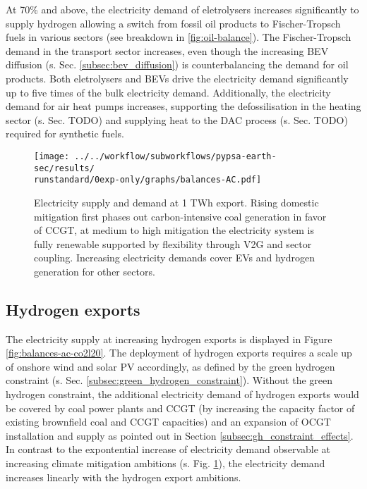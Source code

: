 At 70\% and above, the electricity demand of eletrolysers increases significantly to supply hydrogen allowing a switch from fossil oil products to Fischer-Tropsch fuels in various sectors (see breakdown in \ref{fig:oil-balance}). 
The Fischer-Tropsch demand in the transport sector increases, even though the increasing BEV diffusion (s. Sec. \ref{subsec:bev_diffusion}) is counterbalancing the demand for oil products. 
Both eletrolysers and BEVs drive the electricity demand significantly up to five times of the bulk electricity demand. 
Additionally, the electricity demand for air heat pumps increases, supporting the defossilisation in the heating sector (s. Sec. TODO) and supplying heat to the DAC process (s. Sec. TODO) required for synthetic fuels.


\begin{figure}[h!]
    \centering
    \texttt{[image: ../../workflow/subworkflows/pypsa-earth-sec/results/\\runstandard/0exp-only/graphs/balances-AC.pdf]}
    \caption{Electricity supply and demand at 1 TWh export. Rising domestic mitigation first phases out carbon-intensive coal generation in favor of CCGT, at medium to high mitigation the electricity system is fully renewable supported by flexibility through V2G and sector coupling. Increasing electricity demands cover EVs and hydrogen generation for other sectors.}
    \label{fig:balances-ac-0exp}
\end{figure}

\subsection{Hydrogen exports}
\label{subsec:increase_h2}

The electricity supply at increasing hydrogen exports is displayed in Figure \ref{fig:balances-ac-co2l20}. The deployment of hydrogen exports requires a scale up of onshore wind and solar PV accordingly, as defined by the green hydrogen constraint (s. Sec. \ref{subsec:green_hydrogen_constraint}).
Without the green hydrogen constraint, the additional electricity demand of hydrogen exports would be covered by coal power plants and CCGT (by increasing the capacity factor of existing brownfield coal and CCGT capacities) and an expansion of OCGT installation and supply as pointed out in Section \ref{subsec:gh_constraint_effects}.
In contrast to the expontential increase of electricity demand observable at increasing climate mitigation ambitions (s. Fig. \ref{fig:balances-ac-0exp}), the electricity demand increases linearly with the hydrogen export ambitions.

